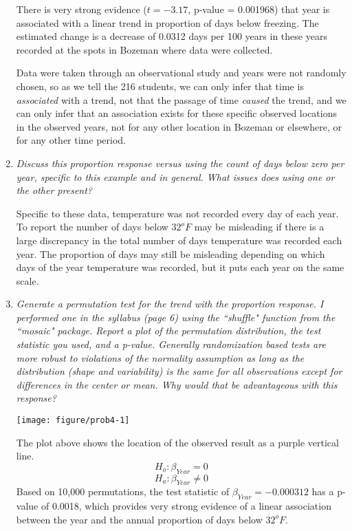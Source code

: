 \documentclass[11pt]{article}\usepackage[]{graphicx}\usepackage[]{color}
\makeatletter
\def\maxwidth{ %
  \ifdim\Gin@nat@width>\linewidth
    \linewidth
  \else
    \Gin@nat@width
  \fi
}
\newenvironment{knitrout}{}{} %
\makeatother
\begin{document}
\begin{enumerate}
There is very strong evidence ($t = \ensuremath{-3.17}$, p-value = 0.001968) that year is associated with a linear trend in proportion of days below freezing. The estimated change is a decrease of 0.0312 days per 100 years in these years recorded at the spots in Bozeman where data were collected.

Data were taken through an observational study and years were not randomly chosen, so as we tell the 216 students, we can only infer that time is \emph{associated} with a trend, not that the passage of time \emph{caused} the trend, and we can only infer that an association exists for these specific observed locations in the observed years, not for any other location in Bozeman or elsewhere, or for any other time period.


\pagebreak
\item%
{\it Discuss this proportion response versus using the count of days below zero per year, specific to this example and in general. What issues does using one or the other present?}

Specific to these data, temperature was not recorded every day of each year. To report the number of days below $32^{o}F$ may be misleading if there is a large discrepancy in the total number of days temperature was recorded each year. The proportion of days may still be misleading depending on which days of the year temperature was recorded, but it puts each year on the same scale.

\item%
{\it Generate a permutation test for the trend with the proportion response. I performed one in the syllabus (page 6) using the ``shuffle" function from the ``mosaic" package. Report a plot of the permutation distribution, the test statistic you used, and a p-value. Generally randomization based tests are more robust to violations of the normality assumption as long as the distribution (shape and variability) is the same for all observations except for differences in the center or mean. Why would that be advantageous with this response?}

\begin{knitrout}\footnotesize
{}\color{fgcolor}

{\centering \texttt{[image: figure/prob4-1]} 

}



\end{knitrout}

The plot above shows the location of the observed result as a purple vertical line. 
$$H_{o}: \beta_{Year} = 0$$
$$H_{a}: \beta_{Year} \neq 0$$
Based on 10,000 permutations, the test statistic of $\beta_{Year} = \ensuremath{-0.000312}$ has a p-value of 0.0018, which provides very strong evidence of a linear association between the year and the annual proportion of days below $32^{o}F$.


\end{enumerate}
\end{document}
